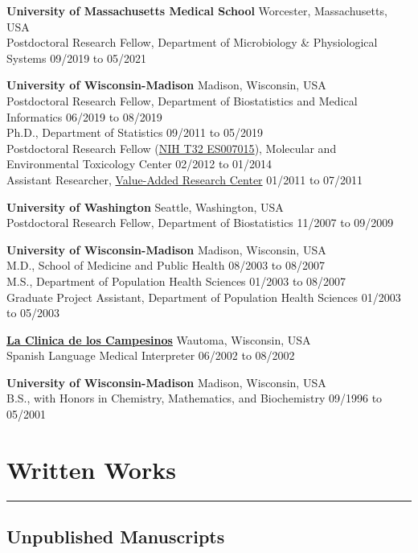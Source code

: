 \documentclass[
  10pt,
]
{article}
\begin{document}
\textbf{University of Massachusetts Medical School} \hfill Worcester,
Massachusetts, USA\\
Postdoctoral Research Fellow, Department of Microbiology \&
Physiological Systems \hfill 09/2019 to 05/2021

\textbf{University of Wisconsin-Madison} \hfill Madison, Wisconsin,
USA\\
Postdoctoral Research Fellow, Department of Biostatistics and Medical
Informatics \hfill 06/2019 to 08/2019\\
Ph.D., Department of Statistics \hfill 09/2011 to 05/2019\\
Postdoctoral Research Fellow
(\href{https://reporter.nih.gov/search/QFqt1UAzrUORCW6sbBz0qw/project-details/8296307}{NIH
T32 ES007015}), Molecular and Environmental Toxicology Center
\hfill 02/2012 to 01/2014\\
Assistant Researcher, \href{https://varc.wceruw.org/}{Value-Added
Research Center} \hfill 01/2011 to 07/2011

\textbf{University of Washington} \hfill Seattle, Washington, USA\\
Postdoctoral Research Fellow, Department of Biostatistics \hfill 11/2007
to 09/2009

\textbf{University of Wisconsin-Madison} \hfill Madison, Wisconsin,
USA\\
M.D., School of Medicine and Public Health \hfill 08/2003 to 08/2007\\
M.S., Department of Population Health Sciences \hfill 01/2003 to
08/2007\\
Graduate Project Assistant, Department of Population Health Sciences
\hfill 01/2003 to 05/2003

\href{https://famhealth.org/}{\textbf{La Clinica de los Campesinos}}
\hfill Wautoma, Wisconsin, USA\\
Spanish Language Medical Interpreter \hfill 06/2002 to 08/2002

\textbf{University of Wisconsin-Madison} \hfill Madison, Wisconsin,
USA\\
B.S., with Honors in Chemistry, Mathematics, and Biochemistry
\hfill 09/1996 to 05/2001

\section{Written Works}\label{written-works}

\hrule

\subsection{Unpublished Manuscripts}\label{unpublished-manuscripts}
\end{document}
